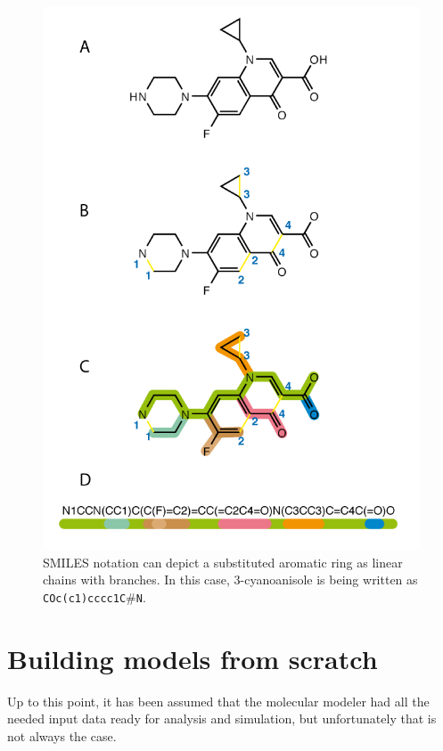 \begin{figure}[H]
	\begin{center}
	\includegraphics[height=0.9\textheight]{./figures/02/smiles.png}
	\end{center}
	\cprotect\caption[SMILES notation]{SMILES notation can depict a substituted aromatic ring as linear chains with branches. In this case, 3-cyanoanisole is being written as \texttt{COc(c1)cccc1C$\# $N}.}
	\label{fig:smiles}
\end{figure}

\section{Building models from scratch}
\label{section:buildingmodels}
Up to this point, it has been assumed that the molecular modeler had all the needed input data ready for analysis and simulation, but unfortunately that is not always the case.

